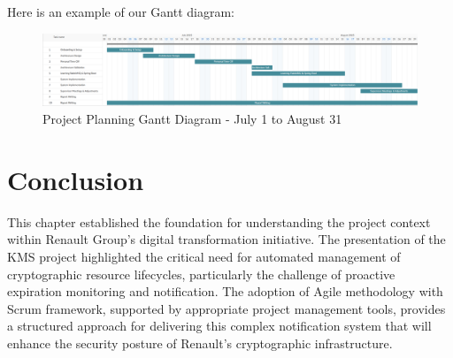 Here is an example of our Gantt diagram:

\begin{figure}[H]
    \centering
    \includegraphics[width=1\linewidth]{images/gantt_diagram.png}
    \caption{Project Planning Gantt Diagram - July 1 to August 31}
    \label{fig:gantt_diagram}
\end{figure}

\section*{Conclusion}

This chapter established the foundation for understanding the project context within Renault Group's digital transformation initiative. The presentation of the KMS project highlighted the critical need for automated management of cryptographic resource lifecycles, particularly the challenge of proactive expiration monitoring and notification. The adoption of Agile methodology with Scrum framework, supported by appropriate project management tools, provides a structured approach for delivering this complex notification system that will enhance the security posture of Renault's cryptographic infrastructure.